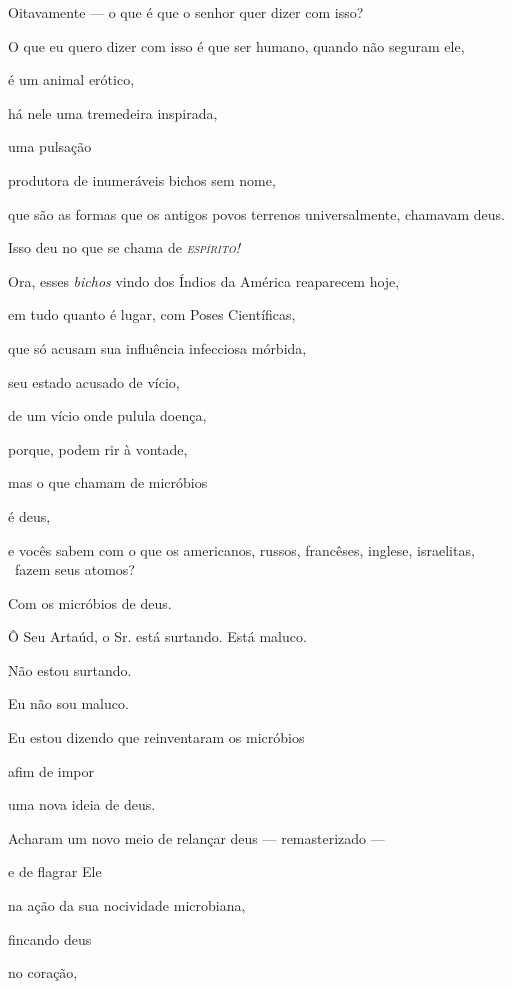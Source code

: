 

Oitavamente --- o que é que o senhor quer dizer com isso?


O que eu quero dizer com isso é que ser humano, quando não seguram ele,

é um animal erótico,

há nele uma tremedeira inspirada,

uma pulsação

produtora de inumeráveis bichos sem nome,

que são as formas que os antigos povos terrenos universalmente, chamavam deus.

Isso deu no que se chama de \textit{\textsc{espírito!}}

Ora, esses \emph{bichos} vindo dos Índios da América reaparecem hoje,

em tudo quanto é lugar, com Poses Científicas,

que só acusam sua influência infecciosa mórbida,

seu estado acusado de vício,

de um vício onde pulula doença,

porque, podem rir à vontade,

mas o que chamam de micróbios

é deus, 

e vocês sabem com o que os americanos, russos, francêses, inglese,
israelitas, ~fazem seus atomos?

Com os micróbios de deus.


Ô Seu Artaúd, o Sr. está surtando. Está maluco.


Não estou surtando.

Eu não sou maluco.

Eu estou dizendo que reinventaram os micróbios

afim de impor

uma nova ideia de deus.

Acharam um novo meio de relançar deus --- remasterizado ---

e de flagrar Ele

na ação da sua nocividade microbiana,

fincando deus

no coração,

